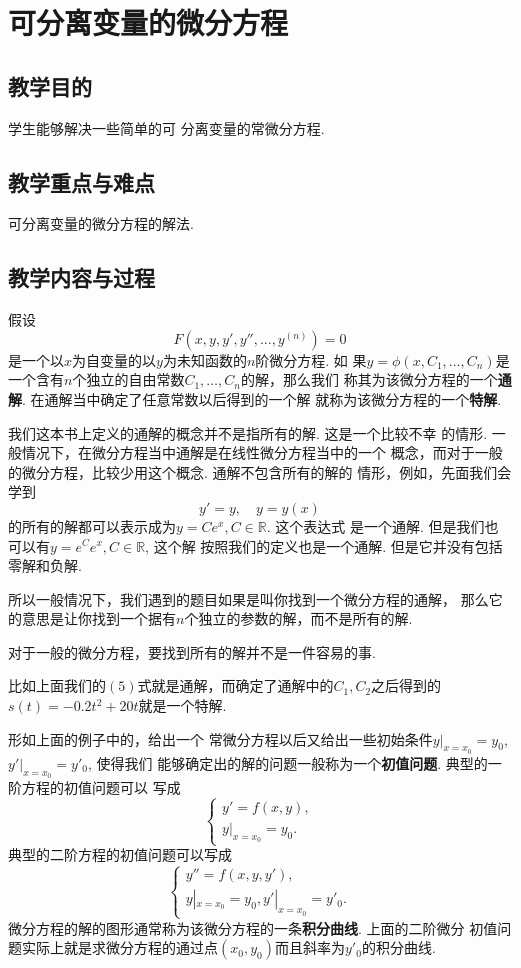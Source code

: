 \documentclass[a4paper, titlepage, twoside]{article}
\numberwithin{equation}{section}
\begin{document}
\section{可分离变量的微分方程}
\subsection{教学目的}
学生能够解决一些简单的可
分离变量的常微分方程. 
\subsection{教学重点与难点}
可分离变量的微分方程的解法. 
\subsection{教学内容与过程}
\begin{definition}
	假设
	$$ F(x,y, y', y'', \ldots, y^{(n)})=0$$
	是一个以$x$为自变量的以$y$为未知函数的$n$阶微分方程. 如
	果$y=\phi(x,C_1,\ldots,
	C_n)$是一个含有$n$个独立的自由常数$C_1,\ldots, C_n$的解，那么我们
	称其为该微分方程的一个{\bf 通解}. 
	在通解当中确定了任意常数以后得到的一个解
	就称为该微分方程的一个{\bf 特解}. 
\end{definition}
\begin{remark}
	我们这本书上定义的通解的概念并不是指所有的解. 这是一个比较不幸
	的情形. 一般情况下，在微分方程当中通解是在线性微分方程当中的一个
	概念，而对于一般的微分方程，比较少用这个概念. 通解不包含所有的解的
	情形，例如，先面我们会学到
	$$ y'=y, \quad y=y(x)$$
	的所有的解都可以表示成为$y=Ce^{x}, C\in \mathbb{R}$. 这个表达式
	是一个通解. 但是我们也可以有$y=e^Ce^x, C\in \mathbb{R}$, 这个解
	按照我们的定义也是一个通解. 但是它并没有包括零解和负解. 

	所以一般情况下，我们遇到的题目如果是叫你找到一个微分方程的通解，
	那么它的意思是让你找到一个据有$n$个独立的参数的解，而不是所有的解. 

	对于一般的微分方程，要找到所有的解并不是一件容易的事. 
\end{remark}

\begin{example}
比如上面我们的$(5)$式就是通解，而确定了通解中的$C_1,
C_2$之后得到的$s(t)=-0.2t^2 +20t$就是一个特解. 
\end{example}

形如上面的例子中的，给出一个
常微分方程以后又给出一些初始条件$y|_{x=x_0}=y_0$, $y'|_{x=x_0}=y'_0$, 使得我们
能够确定出的解的问题一般称为一个{\bf 初值问题}. 典型的一阶方程的初值问题可以
写成
$$ \begin{cases}  y'=f(x,y),\\  y|_{x=x_0}=y_0.\end{cases}
$$
典型的二阶方程的初值问题可以写成
$$ \begin{cases}  y''=f(x,y,y'),\\  y|_{x=x_0}=y_0, y'|_{x=x_0}=y'_0.
\end{cases}
$$
微分方程的解的图形通常称为该微分方程的一条{\bf 积分曲线}. 上面的二阶微分
初值问题实际上就是求微分方程的通过点$(x_0,y_0)$而且斜率为$y'_0$的积分曲线. 
\end{document}

